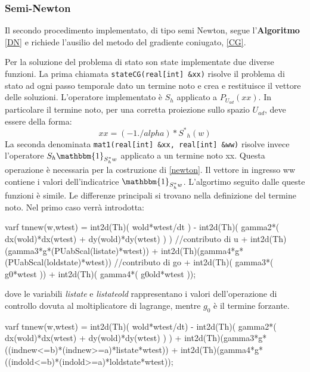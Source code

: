 \subsubsection{Semi-Newton}
Il secondo procedimento implementato, di tipo semi Newton, segue l'\textbf{Algoritmo} \ref{DN} e richiede l'ausilio del metodo del gradiente coniugato, \ref{CG}.
\par
Per la soluzione del problema di stato son state implementate due diverse funzioni. La prima chiamata \texttt{stateCG(real[int] \&xx)} risolve il problema di stato ad ogni passo temporale dato un termine noto e crea e restituisce il vettore delle soluzioni. L'operatore implementato è $S_h$ applicato a $P_{U_{ad}}(xx)$.
In particolare il termine noto, per una corretta proiezione sullo spazio $U_{ad}$, deve essere della forma:
\begin{equation}
xx = (-1./alpha)*{S^{*}}_{h}(w)
\end{equation}
La seconda denominata \texttt{mat1(real[int] \&xx, real[int] \&ww)} risolve invece l'operatore $S_h\mathbbm{1}_{S^*_hw}$  applicato a un termine noto xx. Questa operazione è necessaria per la costruzione di \eqref{newton}. Il vettore in ingresso ww contiene i valori dell'indicatrice $\mathbbm{1}_{S^*_hw}$.
L'algortimo seguito dalle queste funzioni è simile. Le differenze principali si trovano nella definizione del termine noto. Nel primo caso verrà introdotta:
\begin{Code}[caption={Matrice \texttt{tnnew(w,wtest)} per \texttt{stateCG(real[int] \&xx)}}]
varf tnnew(w,wtest) =   int2d(Th)( wold*wtest/dt )
				  	  - int2d(Th)( gamma2*( dx(wold)*dx(wtest) + dy(wold)*dy(wtest) ) )
						//contributo di u
					  + int2d(Th)(gamma3*g*(PUabScal(listate)*wtest))
					  + int2d(Th)(gamma4*g*(PUabScal(loldstate)*wtest)) 
						//contributo di go 
					  + int2d(Th)( gamma3*( g0*wtest ))
			 		  + int2d(Th)( gamma4*( g0old*wtest ));
\end{Code}
dove le variabili \textit{listate} e \textit{listateold} rappresentano i valori dell'operazione di controllo dovuta al moltiplicatore di lagrange, mentre $g_0$ è il termine forzante.
\begin{Code}[caption={Matrice \texttt{tnnew(w,wtest)} per \texttt{mat1(real[int] \&xx, real[int] \&ww)}}]
varf tnnew(w,wtest) =  int2d(Th)( wold*wtest/dt) 
	  				 - int2d(Th)( gamma2*( dx(wold)*dx(wtest) + dy(wold)*dy(wtest) ) ) 
				     + int2d(Th)(gamma3*g*((indnew<=b)*(indnew>=a)*listate*wtest))
					 + int2d(Th)(gamma4*g*((indold<=b)*(indold>=a)*loldstate*wtest));
\end{Code}
